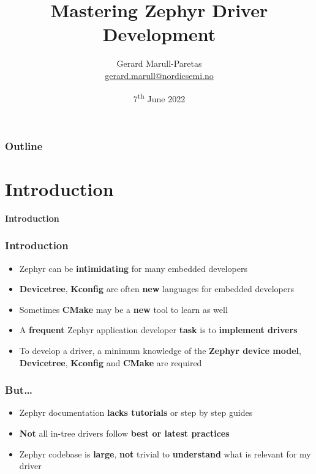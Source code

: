 \documentclass[handout]{beamer}
\title{Mastering Zephyr Driver\\Development}
\author{
  \texorpdfstring{
    Gerard Marull-Paretas\\
    \href{mailto:gerard.marull@nordicsemi.no}{gerard.marull@nordicsemi.no}
  }{Gerard Marull-Paretas}
}
\institute{Nordic Semiconductor ASA}
\date{7\textsuperscript{th} June 2022}
\begin{document}

\begin{frame}[plain]
  \titlepage{}
\end{frame}

\begin{frame}
  \frametitle{Outline}
  \tableofcontents
\end{frame}


\section{Introduction}

\begin{frame}
  \begin{center}
    \Huge \textbf{Introduction}
  \end{center}
\end{frame}

\begin{frame}
  \frametitle{Introduction}

  \begin{itemize}
    \item Zephyr can be \textbf{intimidating} for many embedded developers
    \item \textbf{Devicetree}, \textbf{Kconfig} are often \textbf{new}
          languages for embedded developers
    \item Sometimes \textbf{CMake} may be a \textbf{new} tool to learn as
          well
    \item A \textbf{frequent} Zephyr application developer \textbf{task} is to
          \textbf{implement drivers}
    \item To develop a driver, a minimum knowledge of the
          \textbf{Zephyr device model}, \textbf{Devicetree}, \textbf{Kconfig}
          and \textbf{CMake} are required
  \end{itemize}
\end{frame}

\begin{frame}
  \frametitle{But\ldots}

  \begin{itemize}
    \item Zephyr documentation \textbf{lacks tutorials} or step by step guides
    \item \textbf{Not} all in-tree drivers follow
          \textbf{best or latest practices}
    \item Zephyr codebase is \textbf{large}, \textbf{not} trivial to
          \textbf{understand} what is relevant for my driver
  \end{itemize}
\end{frame}
\end{document}

